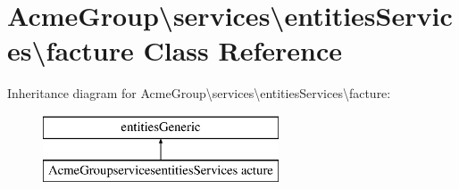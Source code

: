 \hypertarget{class_acme_group_1_1services_1_1entities_services_1_1facture}{\section{Acme\+Group\textbackslash{}services\textbackslash{}entities\+Services\textbackslash{}facture Class Reference}
\label{class_acme_group_1_1services_1_1entities_services_1_1facture}
}
Inheritance diagram for Acme\+Group\textbackslash{}services\textbackslash{}entities\+Services\textbackslash{}facture\+:\begin{figure}[H]
\begin{center}
\leavevmode
\includegraphics[height=2.000000cm]{class_acme_group_1_1services_1_1entities_services_1_1facture}
\end{center}
\end{figure}
